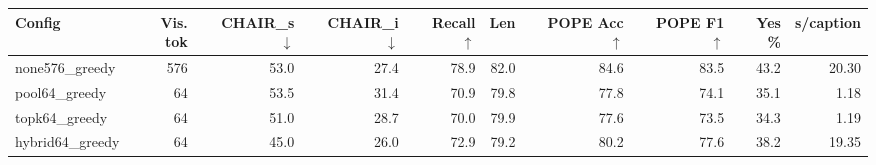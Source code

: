 \begin{tabular}{lrrrrrrrrr}
\toprule
Config & Vis. tok & CHAIR\_s $\downarrow$ & CHAIR\_i $\downarrow$ & Recall $\uparrow$ & Len & POPE Acc $\uparrow$ & POPE F1 $\uparrow$ & Yes \% & s/caption \\
\midrule
none576\_greedy & 576 & 53.0 & 27.4 & 78.9 & 82.0 & 84.6 & 83.5 & 43.2 & 20.30 \\
pool64\_greedy & 64 & 53.5 & 31.4 & 70.9 & 79.8 & 77.8 & 74.1 & 35.1 & 1.18 \\
topk64\_greedy & 64 & 51.0 & 28.7 & 70.0 & 79.9 & 77.6 & 73.5 & 34.3 & 1.19 \\
hybrid64\_greedy & 64 & 45.0 & 26.0 & 72.9 & 79.2 & 80.2 & 77.6 & 38.2 & 19.35 \\
\bottomrule
\end{tabular}
